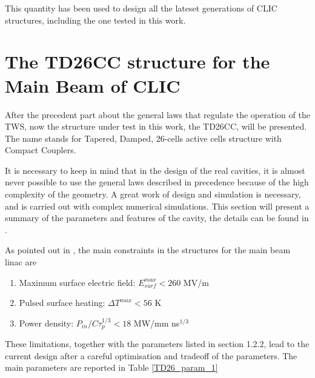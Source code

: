 This quantity has been used to design all the lateset generations of CLIC structures, including the one tested in this work.






\section[The TD26CC structure for the Main Beam of CLIC]{The TD26CC structure for the Main Beam of CLIC}

After the precedent part about the general laws that regulate the operation of the TWS, now the structure under test in this work, the TD26CC, will be presented. The name stands for Tapered, Damped, 26-cells active cells structure with Compact Couplers.

It is necessary to keep in mind that in the design of the real cavities, it is almost never possible to use the general laws described in precedence because of the high complexity of the geometry. A great work of design and simulation is necessary, and is carried out with complex numerical simulations. This section will present a summary of the parameters and features of the cavity, the details can be found in \cite{CLIC:cdr,Grudiev:td26cc,Lunin:1333709}.

As pointed out in \cite{CLIC:cdr}, the main constraints in the structures for the main beam linac are 
\begin{enumerate}
\item Maximum surface electric field: $E_{surf}^{max} < 260$ MV/m
\item Pulsed surface heating: $\Delta T^{max} < 56$ K
\item Power density: $P_{in}/C\tau_p^{1/3} < 18$ MW/mm ns$^{1/3}$
\end{enumerate}

These limitations, together with the parameters listed in section 1.2.2, lead to the current design after a careful optimisation and tradeoff of the parameters. The main parameters are reported in Table \ref{TD26_param_1}

